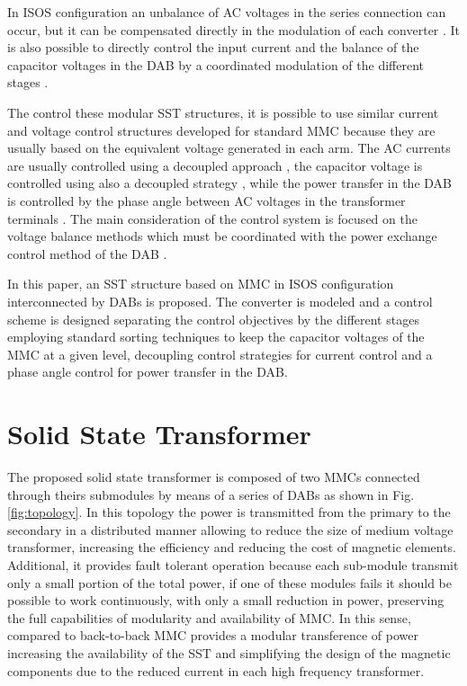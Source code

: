 \documentclass[conference]{IEEEtran}
\begin{document}
In ISOS configuration an unbalance of AC voltages in the series connection can occur, but it can be compensated directly in the modulation of each  converter \cite{6294454}. It is also possible to directly  control the input current and the balance of the capacitor voltages in the DAB by a coordinated modulation of the different stages \cite{5750052}.

The control these modular SST structures, it is possible to use similar current and voltage control structures developed for standard MMC because they are usually based on the equivalent voltage generated in each arm.  The AC currents are usually  controlled using a decoupled approach \cite{7047221}, the capacitor voltage is controlled  using also a decoupled strategy \cite{7094290}, while the power transfer in the DAB is controlled by the phase angle between AC voltages in the transformer terminals \cite{5762359}. The main consideration of the control system is focused on the voltage balance methods which must be coordinated with the power exchange control method of the DAB \cite{7927431}.

In this paper, an SST structure based on MMC in ISOS configuration interconnected by DABs is proposed. The converter is modeled and a control scheme is designed separating the control objectives by the different stages employing standard sorting techniques to keep the capacitor voltages of the MMC at a given level, decoupling control strategies for current control and a phase angle control for power transfer in the DAB.



\section{Solid State Transformer}
The proposed solid state transformer is composed of two MMCs connected through theirs submodules by means of a series of DABs as shown in Fig. \ref{fig:topology}. In this  topology the power is transmitted from the primary to the secondary in a distributed manner allowing to reduce the size of medium voltage transformer, increasing the efficiency and reducing the cost of magnetic elements.  Additional, it provides fault tolerant operation because each sub-module transmit only a small portion of the total power, if one of these modules fails it should be possible to work continuously, with only a small reduction in power,  preserving the full capabilities of modularity and availability of MMC. In this sense, compared to back-to-back MMC provides a modular transference of power increasing the availability of the SST and simplifying the design of the magnetic components due to the reduced current in each high frequency transformer.
\end{document}
